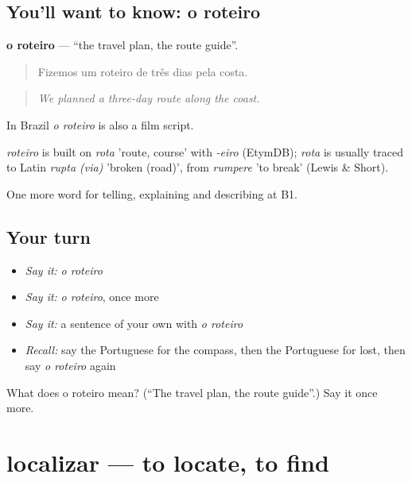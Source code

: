 \subsection*{You'll want to know: o roteiro}
\textbf{o roteiro} — \textquotedblleft{}the travel plan, the route guide\textquotedblright{}.

\begin{quote}
Fizemos um roteiro de três dias pela costa.
\end{quote}

\begin{quote}
\emph{We planned a three-day route along the coast.}
\end{quote}

In Brazil \emph{o roteiro} is also a film script.

\begin{cousinweb}
\emph{roteiro} is built on \emph{rota} 'route, course' with \emph{-eiro} (EtymDB); \emph{rota} is usually traced to Latin \emph{rupta (via)} 'broken (road)', from \emph{rumpere} 'to break' (Lewis \& Short).
\end{cousinweb}

\begin{grammarlens}[title={What you've built}]
One more word for telling, explaining and describing at B1.
\end{grammarlens}

\subsection*{Your turn}
\begin{itemize}
\raggedright
  \item \emph{Say it:} \emph{o roteiro}
  \item \emph{Say it:} \emph{o roteiro}, once more
  \item \emph{Say it:} a sentence of your own with \emph{o roteiro}
  \item \emph{Recall:} say the Portuguese for the compass, then the Portuguese for lost, then say \emph{o roteiro} again
\end{itemize}

\begin{tcolorbox}[breakable,colback=teal!4,colframe=teal!35!black,title={Before you move on}]
What does o roteiro mean? (\textquotedblleft{}The travel plan, the route guide\textquotedblright{}.) Say it once more.
\end{tcolorbox}
\section[localizar]{localizar — to locate, to find}


